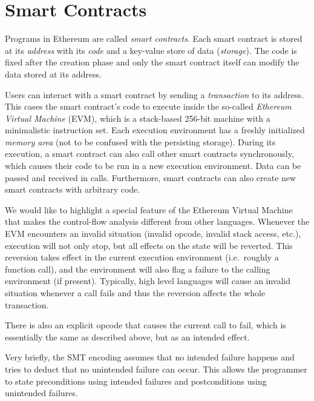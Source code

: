 \section{Smart Contracts}
\label{section:smart_contracts}


Programs in Ethereum are called \emph{smart contracts}.
Each smart contract is stored at its \emph{address} with its \emph{code}
and a key-value store of data (\emph{storage}). The code is fixed after the creation phase
and only the smart contract itself can modify the data stored at its address.

Users can interact with a smart contract by sending a \emph{transaction}
to its address. This cases the smart contract's code to execute inside
the so-called \emph{Ethereum Virtual Machine} (EVM), which is a stack-based
256-bit machine with a minimalistic instruction set. Each execution environment
has a freshly initialized \emph{memory area} (not to be confused with the persisting
storage). During its execution, a smart contract can also call other
smart contracts synchronously, which causes their code to be run in
a new execution environment. Data can be passed and received in calls.
Furthermore, smart contracts can also create new smart contracts with
arbitrary code.


We would like to highlight a special feature of the Ethereum Virtual Machine
that makes the control-flow analysis different from other languages.
Whenever the EVM encounters an invalid situation (invalid opcode, invalid
stack access, etc.), execution will not only stop, but all effects on the
state will be reverted. This reversion takes effect in the current execution
environment (i.e.\ roughly a function call), and the environment will also
flag a failure to the calling environment (if present). Typically, high level languages
will cause an invalid situation whenever a call fails and thus the reversion
affects the whole transaction.

There is also an explicit opcode that causes the current call to fail, which is
essentially the same as described above, but as an intended effect.


Very briefly, the SMT encoding assumes that no intended failure happens
and tries to deduct that no unintended failure can occur. This allows the
programmer to state preconditions using intended failures and postconditions
using unintended failures.
